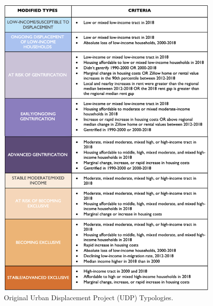 \documentclass[12pt]{article}
\begin{document}
\begin{figure}%
  \centering %
  \includegraphics[height=0.95\textheight]{images/typology_sheet_2018}
  \captionsetup{justification=centering, singlelinecheck=false, margin=2cm}
  \caption[UDP Displacement Typologies]{Original Urban Displacement Project (UDP) Typologies.}
  \label{fig:original_udp}
\end{figure}

\clearpage
\sloppy


\titleformat{\section}{\fontsize{12}{14}\bfseries\centering}{\thesection}{0.5em}{}
\printbibliography[heading=bibintoc]



\end{document}
